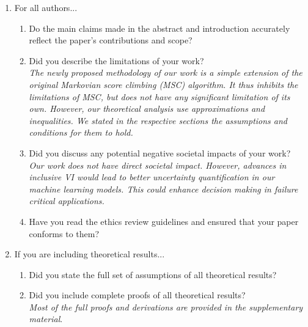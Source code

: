 \begin{enumerate}

\item For all authors...
\begin{enumerate}
  \item Do the main claims made in the abstract and introduction accurately reflect the paper's contributions and scope?
    \answerYes{}
  \item Did you describe the limitations of your work?
    \answerYes{} \\
    \textit{The newly proposed methodology of our work is a simple extension of the original Markovian score climbing (MSC) algorithm.
      It thus inhibits the limitations of MSC, but does not have any significant limitation of its own.
      However, our theoretical analysis use approximations and inequalities.
      We stated in the respective sections the assumptions and conditions for them to hold.
    }
  \item Did you discuss any potential negative societal impacts of your work?
    \answerNo{} \\
    \textit{Our work does not have direct societal impact.
      However, advances in inclusive VI would lead to better uncertainty quantification in our machine learning models.
      This could enhance decision making in failure critical applications.
    }
  \item Have you read the ethics review guidelines and ensured that your paper conforms to them?
    \answerYes{}
\end{enumerate}

\item If you are including theoretical results...
\begin{enumerate}
  \item Did you state the full set of assumptions of all theoretical results?
    \answerYes{}
  \item Did you include complete proofs of all theoretical results?
    \answerYes{} \\
    \textit{Most of the full proofs and derivations are provided in the supplementary material}.
\end{enumerate}


\end{enumerate}
